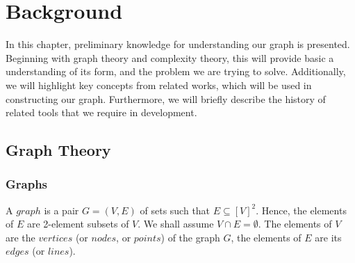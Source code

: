 
\chapter{Background}

\ifpdf
    \graphicspath{{Chapter2/Figs/Raster/}{Chapter2/Figs/PDF/}{Chapter2/Figs/}}
\else
    \graphicspath{{Chapter2/Figs/Vector/}{Chapter2/Figs/}}
\fi

In this chapter, preliminary knowledge for understanding our graph is presented. Beginning with graph theory and complexity theory, this will provide basic a understanding of its form, and the problem we are trying to solve. Additionally, we will highlight key concepts from related works, which will be used in constructing our graph. Furthermore, we will briefly describe the history of related tools that we require in development. 

\section[Graph Theory]{Graph Theory}

\subsection{Graphs}
A $graph$ is a pair $G=(V,E)$ of sets such that $E\subseteq[V]^{2}$. Hence, the elements of $E$ are 2-element subsets of $V$. We shall assume $V{\cap}E=\emptyset$. The elements of $V$ are the $vertices$ (or $nodes$, or $points$) of the graph $G$, the elements of $E$ are its $edges$ (or $lines$). 

